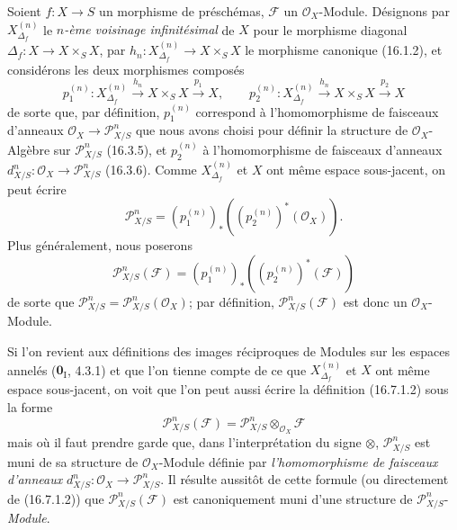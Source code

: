 \begin{env}[16.7.1]
\label{IV.16.7.1}
Soient $f:X\to S$ un morphisme de préschémas, $\mathscr{F}$ un
$\mathcal{O}_X$-Module. Désignons par $X_{\Delta_f}^{(n)}$ le \emph{$n$-ème
voisinage infinitésimal} de $X$ pour le morphisme diagonal
$\Delta_f:X\to X\times_S X$, par
$h_n:X_{\Delta_f}^{(n)}\to X\times_S X$ le morphisme canonique (16.1.2), et
considérons les deux morphismes composés
\[
  p_1^{(n)}:X_{\Delta_f}^{(n)}\xrightarrow{h_n}X\times_S X
  \xrightarrow{p_1}X,\qquad
  p_2^{(n)}:X_{\Delta_f}^{(n)}\xrightarrow{h_n}X\times_S X
  \xrightarrow{p_2}X
\]
de sorte que, par définition, $p_1^{(n)}$ correspond à l'homomorphisme de
faisceaux d'anneaux $\mathcal{O}_X\to\mathscr{P}_{X/S}^n$ que nous avons
choisi pour définir la structure de $\mathcal{O}_X$-Algèbre sur
$\mathscr{P}_{X/S}^n$ (16.3.5), et $p_2^{(n)}$ à l'homomorphisme de faisceaux
d'anneaux $d_{X/S}^n:\mathcal{O}_X\to\mathscr{P}_{X/S}^n$ (16.3.6). Comme
$X_{\Delta_f}^{(n)}$ et $X$ ont même espace sous-jacent, on peut écrire
\[
  \mathscr{P}_{X/S}^n
  =(p_1^{(n)})_*((p_2^{(n)})^*(\mathcal{O}_X)).
  \tag{16.7.1.1}
  \label{IV.16.7.1.1}
\]
Plus généralement, nous poserons
\[
  \mathscr{P}_{X/S}^n(\mathscr{F})
  =(p_1^{(n)})_*((p_2^{(n)})^*(\mathscr{F}))
  \tag{16.7.1.2}
  \label{IV.16.7.1.2}
\]
de sorte que
$\mathscr{P}_{X/S}^n=\mathscr{P}_{X/S}^n(\mathcal{O}_X)$; par définition,
$\mathscr{P}_{X/S}^n(\mathscr{F})$ est donc un $\mathcal{O}_X$-Module.
\end{env}

\begin{env}[16.7.2]
\label{IV.16.7.2}
Si l'on revient aux définitions des images réciproques de Modules sur les
espaces annelés ($\mathbf{0}_{\mathrm I}$, 4.3.1) et que l'on tienne compte de ce que
$X_{\Delta_f}^{(n)}$ et $X$ ont même espace sous-jacent, on voit que l'on peut
aussi écrire la définition (16.7.1.2) sous la forme
\[
  \mathscr{P}_{X/S}^n(\mathscr{F})
  =\mathscr{P}_{X/S}^n\otimes_{\mathcal{O}_X}\mathscr{F}
  \tag{16.7.2.1}
  \label{IV.16.7.2.1}
\]
mais où il faut prendre garde que, dans l'interprétation du signe $\otimes$,
$\mathscr{P}_{X/S}^n$ est muni de sa structure de $\mathcal{O}_X$-Module
définie par \emph{l'homomorphisme de faisceaux d'anneaux}
$d_{X/S}^n:\mathcal{O}_X\to\mathscr{P}_{X/S}^n$. Il résulte aussitôt de cette
formule (ou directement de (16.7.1.2)) que
$\mathscr{P}_{X/S}^n(\mathscr{F})$ est canoniquement muni d'une structure de
$\mathscr{P}_{X/S}^n$-\emph{Module}.
\end{env}

